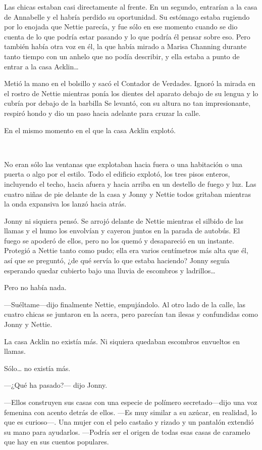 Las chicas estaban casi directamente al frente. En un segundo, entrarían
a la casa de Annabelle y el habría perdido su oportunidad. Su estómago
estaba rugiendo por lo enojada que Nettie parecía, y fue sólo en ese
momento cuando se dio cuenta de lo que podría estar pasando y lo que
podría él pensar sobre eso. Pero también había otra voz en él, la que
había mirado a Marisa Channing durante tanto tiempo con un anhelo que no
podía describir, y ella estaba a punto de entrar a la casa
Acklin\ldots{}

Metió la mano en el bolsillo y sacó el Contador de Verdades. Ignoró la
mirada en el rostro de Nettie mientras ponía los dientes del aparato
debajo de su lengua y lo cubría por debajo de la barbilla Se levantó,
con su altura no tan impresionante, respiró hondo y dio un paso hacia
adelante para cruzar la calle.

En el mismo momento en el que la casa Acklin explotó.

~

No eran sólo las ventanas que explotaban hacia fuera o una habitación o
una puerta o algo por el estilo. Todo el edificio explotó, los tres
pisos enteros, incluyendo el techo, hacia afuera y hacia arriba en un
destello de fuego y luz. Las cuatro niñas de pie delante de la casa y
Jonny y Nettie todos gritaban mientras la onda expansiva los lanzó hacia
atrás.

Jonny ni siquiera pensó. Se arrojó delante de Nettie mientras el silbido
de las llamas y el humo los envolvían y cayeron juntos en la parada de
autobús. El fuego se apoderó de ellos, pero no los quemó y desapareció
en un instante. Protegió a Nettie tanto como pudo; ella era varios
centímetros más alta que él, así que se preguntó, ¿de qué servía lo que
estaba haciendo? Jonny seguía esperando quedar cubierto bajo una lluvia
de escombros y ladrillos\ldots{}

Pero no había nada.

---Suéltame---dijo finalmente Nettie, empujándolo. Al otro lado de la
calle, las cuatro chicas se juntaron en la acera, pero parecían tan
ilesas y confundidas como Jonny y Nettie.

La casa Acklin no existía más. Ni siquiera quedaban escombros envueltos
en llamas.

Sólo\ldots{} no existía más.

---¿Qué ha pasado?--- dijo Jonny.

---Ellos construyen sus casas con una especie de polímero
secretado---dijo una voz femenina con acento detrás de ellos. ---Es muy
similar a su azúcar, en realidad, lo que es curioso---. Una mujer con el
pelo castaño y rizado y un pantalón extendió su mano para ayudarlos.
---Podría ser el origen de todas esas casas de caramelo que hay en sus
cuentos populares.

